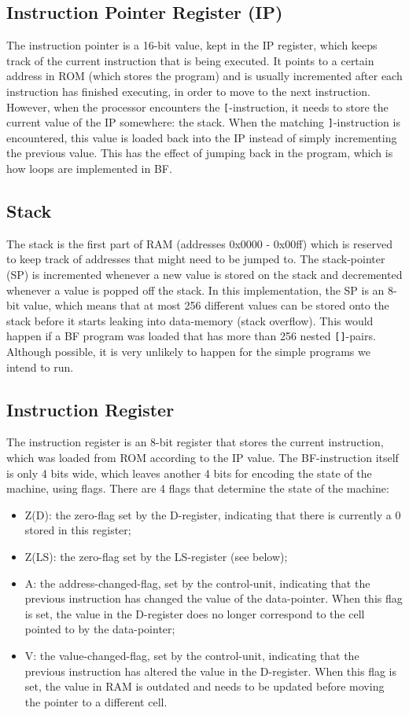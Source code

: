 \subsection{Instruction Pointer Register (IP)}
The instruction pointer is a 16-bit value, kept in the IP register, which keeps track of the current instruction that is being executed. It points to a certain address in ROM (which stores the program) and is usually incremented after each instruction has finished executing, in order to move to the next instruction. However, when the processor encounters the \texttt{[}-instruction, it needs to store the current value of the IP somewhere: the stack. When the matching \texttt{]}-instruction is encountered, this value is loaded back into the IP instead of simply incrementing the previous value. This has the effect of jumping back in the program, which is how loops are implemented in BF.

\subsection{Stack}
The stack is the first part of RAM (addresses 0x0000 - 0x00ff) which is reserved to keep track of addresses that might need to be jumped to. The stack-pointer (SP) is incremented whenever a new value is stored on the stack and decremented whenever a value is popped off the stack. In this implementation, the SP is an 8-bit value, which means that at most 256 different values can be stored onto the stack before it starts leaking into data-memory (stack overflow). This would happen if a BF program was loaded that has more than 256 nested \texttt{[]}-pairs. Although possible, it is very unlikely to happen for the simple programs we intend to run.

\subsection{Instruction Register}
The instruction register is an 8-bit register that stores the current instruction, which was loaded from ROM according to the IP value. The BF-instruction itself is only 4 bits wide, which leaves another 4 bits for encoding the state of the machine, using flags. There are 4 flags that determine the state of the machine:
\begin{itemize}
\item Z(D): the zero-flag set by the D-register, indicating that there is currently a 0 stored in this register;
\item Z(LS): the zero-flag set by the LS-register (see below);
\item A: the address-changed-flag, set by the control-unit, indicating that the previous instruction has changed the value of the data-pointer. When this flag is set, the value in the D-register does no longer correspond to the cell pointed to by the data-pointer;
\item V: the value-changed-flag, set by the control-unit, indicating that the previous instruction has altered the value in the D-register. When this flag is set, the value in RAM is outdated and needs to be updated before moving the pointer to a different cell.
\end{itemize}

